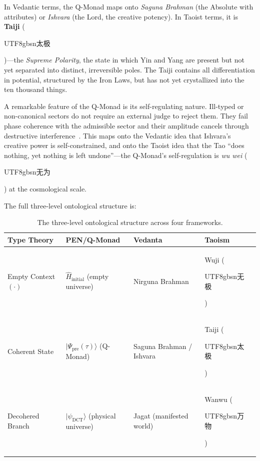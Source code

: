 \documentclass[12pt,a4paper]{article}
\begin{document}
In Vedantic terms, the Q-Monad maps onto \emph{Saguna Brahman} (the Absolute with attributes) or \emph{Ishvara} (the Lord, the creative potency). In Taoist terms, it is \textbf{Taiji} (\begin{CJK}{UTF8}{gbsn}太极\end{CJK})---the \emph{Supreme Polarity}, the state in which Yin and Yang are present but not yet separated into distinct, irreversible poles. The Taiji contains all differentiation in potential, structured by the Iron Laws, but has not yet crystallized into the ten thousand things.

A remarkable feature of the Q-Monad is its self-regulating nature. Ill-typed or non-canonical sectors do not require an external judge to reject them. They fail phase coherence with the admissible sector and their amplitude cancels through destructive interference~\cite{pen2}. This maps onto the Vedantic idea that Ishvara's creative power is self-constrained, and onto the Taoist idea that the Tao ``does nothing, yet nothing is left undone''---the Q-Monad's self-regulation is \emph{wu wei} (\begin{CJK}{UTF8}{gbsn}无为\end{CJK}) at the cosmological scale.

The full three-level ontological structure is:

\begin{table}[h]
\centering
\renewcommand{\arraystretch}{1.3}
\begin{tabular}{@{}lllll@{}}
\toprule
\textbf{Type Theory} & \textbf{PEN/Q-Monad} & \textbf{Vedanta} & \textbf{Taoism} \\
\midrule
Empty Context $(\cdot)$ & $\hat{H}_{\mathrm{initial}}$ (empty universe) & Nirguna Brahman & Wuji (\begin{CJK}{UTF8}{gbsn}无极\end{CJK})\\
Coherent State & $|\Psi_{\mathrm{pre}}(\tau)\rangle$ (Q-Monad) & Saguna Brahman / Ishvara & Taiji (\begin{CJK}{UTF8}{gbsn}太极\end{CJK})\\
Decohered Branch & $|\psi_{\mathrm{DCT}}\rangle$ (physical universe) & Jagat (manifested world) & Wanwu (\begin{CJK}{UTF8}{gbsn}万物\end{CJK})\\
\bottomrule
\end{tabular}
\caption{The three-level ontological structure across four frameworks.}
\label{tab:threelevel}
\end{table}
\end{document}
